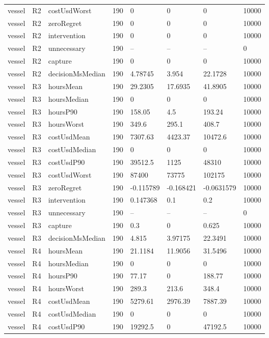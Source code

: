 \begin{tabular}{llllllll}
vessel & R2 & costUsdWorst & 190 & 0 & 0 & 0 & 10000 \\
vessel & R2 & zeroRegret & 190 & 0 & 0 & 0 & 10000 \\
vessel & R2 & intervention & 190 & 0 & 0 & 0 & 10000 \\
vessel & R2 & unnecessary & 190 & -- & -- & -- & 0 \\
vessel & R2 & capture & 190 & 0 & 0 & 0 & 10000 \\
vessel & R2 & decisionMsMedian & 190 & 4.78745 & 3.954 & 22.1728 & 10000 \\
vessel & R3 & hoursMean & 190 & 29.2305 & 17.6935 & 41.8905 & 10000 \\
vessel & R3 & hoursMedian & 190 & 0 & 0 & 0 & 10000 \\
vessel & R3 & hoursP90 & 190 & 158.05 & 4.5 & 193.24 & 10000 \\
vessel & R3 & hoursWorst & 190 & 349.6 & 295.1 & 408.7 & 10000 \\
vessel & R3 & costUsdMean & 190 & 7307.63 & 4423.37 & 10472.6 & 10000 \\
vessel & R3 & costUsdMedian & 190 & 0 & 0 & 0 & 10000 \\
vessel & R3 & costUsdP90 & 190 & 39512.5 & 1125 & 48310 & 10000 \\
vessel & R3 & costUsdWorst & 190 & 87400 & 73775 & 102175 & 10000 \\
vessel & R3 & zeroRegret & 190 & -0.115789 & -0.168421 & -0.0631579 & 10000 \\
vessel & R3 & intervention & 190 & 0.147368 & 0.1 & 0.2 & 10000 \\
vessel & R3 & unnecessary & 190 & -- & -- & -- & 0 \\
vessel & R3 & capture & 190 & 0.3 & 0 & 0.625 & 10000 \\
vessel & R3 & decisionMsMedian & 190 & 4.815 & 3.97175 & 22.3491 & 10000 \\
vessel & R4 & hoursMean & 190 & 21.1184 & 11.9056 & 31.5496 & 10000 \\
vessel & R4 & hoursMedian & 190 & 0 & 0 & 0 & 10000 \\
vessel & R4 & hoursP90 & 190 & 77.17 & 0 & 188.77 & 10000 \\
vessel & R4 & hoursWorst & 190 & 289.3 & 213.6 & 348.4 & 10000 \\
vessel & R4 & costUsdMean & 190 & 5279.61 & 2976.39 & 7887.39 & 10000 \\
vessel & R4 & costUsdMedian & 190 & 0 & 0 & 0 & 10000 \\
vessel & R4 & costUsdP90 & 190 & 19292.5 & 0 & 47192.5 & 10000 \\

\end{tabular}
